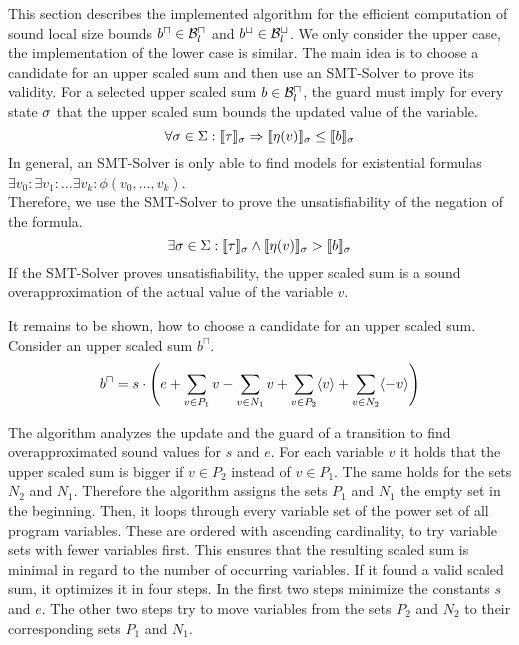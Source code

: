 This section describes the implemented algorithm for the efficient computation of sound local size bounds $b^\sqcap \in \mathcal{B}^\sqcap_l$ and $b^\sqcup \in \mathcal{B}^\sqcup_l$.
We only consider the upper case, the implementation of the lower case is similar.
The main idea is to choose a candidate for an upper scaled sum and then use an SMT-Solver to prove its validity.
For a selected upper scaled sum $b \in \mathcal{B}^\sqcap_l$, the guard must imply for every state $\sigma$ that the upper scaled sum bounds the updated value of the variable.
\[ \forall \sigma \in \Sigma: \llbracket \tau \rrbracket_{\sigma} \Rightarrow \llbracket \eta(v) \rrbracket_{\sigma} \leq \llbracket b \rrbracket_{\sigma} \]
In general, an SMT-Solver is only able to find models for existential formulas $\exists v_0: \exists v_1: \dots \exists v_k: \phi(v_0, \dots, v_k)$. \cite{smt} \\
Therefore, we use the SMT-Solver to prove the unsatisfiability of the negation of the formula.
\[ \exists \sigma \in \Sigma: \llbracket \tau \rrbracket_{\sigma} \wedge \llbracket \eta(v) \rrbracket_{\sigma} > \llbracket b \rrbracket_{\sigma} \]
If the SMT-Solver proves unsatisfiability, the upper scaled sum is a sound overapproximation of the actual value of the variable $v$.

It remains to be shown, how to choose a candidate for an upper scaled sum.
Consider an upper scaled sum $b^\sqcap$.
\[ b^\sqcap = s \cdot \left(
e
+ \sum_{v \in P_1} v
- \sum_{v \in N_1} v
+ \sum_{v \in P_2} \langle v\rangle
+ \sum_{v \in N_2} \langle-v\rangle
\right)
\]

The algorithm analyzes the update and the guard of a transition to find overapproximated sound values for $s$ and $e$.
For each variable $v$ it holds that the upper scaled sum is bigger if $v \in P_2$ instead of $v \in P_1$.
The same holds for the sets $N_2$ and $N_1$.
Therefore the algorithm assigns the sets $P_1$ and $N_1$ the empty set in the beginning. 
Then, it loops through every variable set of the power set of all program variables.
These are ordered with ascending cardinality, to try variable sets with fewer variables first.
This ensures that the resulting scaled sum is minimal in regard to the number of occurring variables.
If it found a valid scaled sum, it optimizes it in four steps.
In the first two steps minimize the constants $s$ and $e$.
The other two steps try to move variables from the sets $P_2$ and $N_2$ to their corresponding sets $P_1$ and $N_1$.

